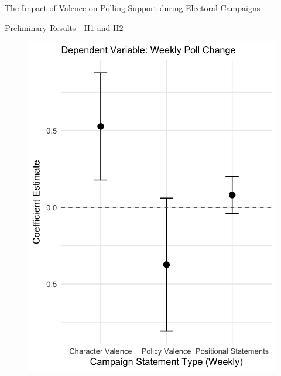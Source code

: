 \documentclass[9pt, aspectratio=169]{beamer}
\begin{document}
\begin{section}{The Impact of Valence on Polling Support during Electoral Campaigns}
\begin{frame}{Preliminary Results - H1 and H2}
    \begin{multicols}{2}
        \begin{figure}
            \centering
            \includegraphics[width=0.7\linewidth]{images/poll_valence.png}
            \label{fig:poll_valence}
        \end{figure}
        

\end{multicols}
\end{frame}
\end{section}
\end{document}
